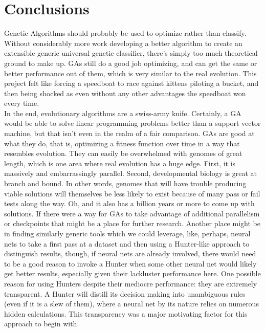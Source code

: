 \chapter{Conclusions} \label{ch:conclusion}
Genetic Algorithms should probably be used to optimize rather than classify.  Without considerably more work developing a better algorithm to create an extensible generic universal genetic classifier, there's simply too much theoretical ground to make up.  GAs still do a good job optimizing, and can get the same or better performance out of them, which is very similar to the real evolution.  This project felt like forcing a speedboat to race against kittens piloting a bucket, and then being shocked as even without any other advantages the speedboat won every time.\\In the end, evolutionary algorithms are a swiss-army knife.  Certainly, a GA would be able to solve linear programming problems better than a support vector machine, but that isn't even in the realm of a fair comparison.  GAs are good at what they do, that is, optimizing a fitness function over time in a way that resembles evolution.  They can easily be overwhelmed with genomes of great length, which is one area where real evolution has a huge edge.  First, it is massively and embarrassingly parallel.  Second, developmental biology is great at branch and bound.  In other words, genomes that will have trouble producing viable solutions will themselves be less likely to exist because of many pass or fail tests along the way.  Oh, and it also has a billion years or more to come up with solutions.  If there were a way for GAs to take advantage of additional parallelism or checkpoints that might be a place for further research.  Another place might be in finding similarly generic tools which we could leverage, like, perhaps, neural nets to take a first pass at a dataset and then using a Hunter-like approach to distinguish results, though, if neural nets are already involved, there would need to be a good reason to invoke a Hunter when some other neural net would likely get better results, especially given their lackluster performance here.  One possible reason for using Hunters despite their mediocre performance: they are extremely transparent.  A Hunter will distill its decision making into unambiguous rules (even if it is a slew of them), where a neural net by its nature relies on numerous hidden calculations.  This transparency was a major motivating factor for this approach to begin with.\\
